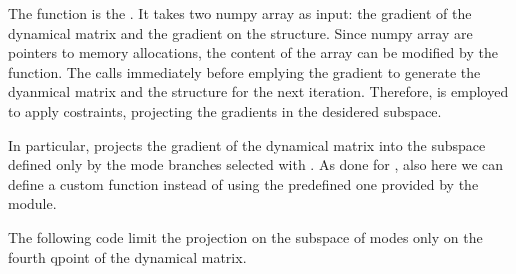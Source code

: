 \documentclass[a4paper,11pt,english]{sphinxmanual}
\begin{document}
\begin{sphinxVerbatim}[commandchars=\\\{\}]
  

 

  
\end{sphinxVerbatim}

\sphinxAtStartPar
The function  is the . It takes two numpy array as input: the gradient of the dynamical matrix and the gradient on the structure.
Since numpy array are pointers to memory allocations, the content of the array can be modified by the function.
The  calls  immediately before emplying the gradient to generate the dyanmical matrix and the structure for the next iteration.
Therefore,  is employed to apply costraints, projecting the gradients in the desidered subspace.

\sphinxAtStartPar
In particular,  projects the gradient of the dynamical matrix into the subspace defined only by the mode branches selected with . As done for , also here we can define a custom function instead of using the predefined one provided by the  module.

\sphinxAtStartPar
The following code limit the projection on the subspace of modes only on the fourth q\sphinxhyphen{}point of the dynamical matrix.
\end{document}
